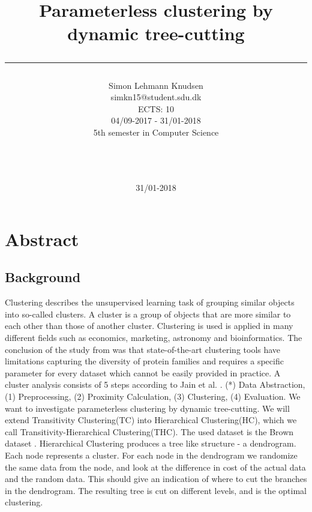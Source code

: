 \documentclass[a4paper,10pt]{article}
\title{ Parameterless clustering by dynamic tree-cutting \rule{10cm}{0.5mm}}
\author{Simon Lehmann Knudsen \\
	simkn15@student.sdu.dk \\
	ECTS: 10 \\
	04/09-2017 - 31/01-2018 \\
	5th semester in Computer Science
\\\rule{5.5cm}{0.5mm}\\}
\date{31/01-2018}
\theoremstyle{plain}
\theoremstyle{definition}
\begin{document}
\maketitle

\newpage
\tableofcontents

\newpage
\section*{Abstract}

\subsection*{Background}
Clustering describes the unsupervised learning task of grouping similar objects into so-called clusters. A cluster is a group of objects that are more similar to each other than those of another cluster. Clustering is used is applied in many different fields such as economics, marketing, astronomy and bioinformatics. The conclusion of the study from \cite{powerLimits} was that state-of-the-art clustering tools have limitations capturing the diversity of protein families and requires a specific parameter for every dataset which cannot be easily provided in practice. A cluster analysis consists of 5 steps according to Jain et al. \cite{19overview}. (*) Data Abstraction, (1) Preprocessing, (2) Proximity Calculation, (3) Clustering, (4) Evaluation. We want to investigate parameterless clustering by dynamic tree-cutting. We will extend Transitivity Clustering(TC) into Hierarchical Clustering(HC), which we call Transitivity-Hierarchical Clustering(THC). The used dataset is the Brown dataset \cite{brown}. Hierarchical Clustering produces a tree like structure - a dendrogram. Each node represents a cluster. For each node in the dendrogram we randomize the same data from the node, and look at the difference in cost of the actual data and the random data. This should give an indication of where to cut the branches in the dendrogram. The resulting tree is cut on different levels, and is the optimal clustering. 
\end{document}
